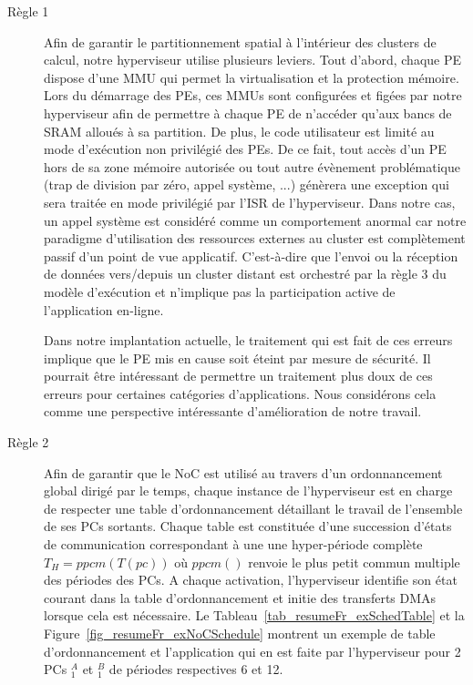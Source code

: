 \documentclass[main.tex]{subfiles}
\begin{document}
\begin{description}
    \item[Règle 1]
        Afin de garantir le partitionnement spatial à l'intérieur des clusters de calcul, notre hyperviseur utilise plusieurs leviers. Tout d'abord, chaque PE dispose d'une MMU qui permet la virtualisation et la protection mémoire. Lors du démarrage des PEs, ces MMUs sont configurées et figées par notre hyperviseur afin de permettre à chaque PE de n'accéder qu'aux bancs de SRAM alloués à sa partition. De plus, le code utilisateur est limité au mode d'exécution non privilégié des PEs. De ce fait, tout accès d'un PE hors de sa zone mémoire autorisée ou tout autre évènement problématique (trap de division par zéro, appel système, ...) génèrera une exception qui sera traitée en mode privilégié par l'ISR de l'hyperviseur. Dans notre cas, un appel système est considéré comme un comportement anormal car notre paradigme d'utilisation des ressources externes au cluster est complètement passif d'un point de vue applicatif. C'est-à-dire que l'envoi ou la réception de données vers/depuis un cluster distant est orchestré par la règle 3 du modèle d'exécution et n'implique pas la participation active de l'application en-ligne.
        
        Dans notre implantation actuelle, le traitement qui est fait de ces erreurs implique que le PE mis en cause soit éteint par mesure de sécurité. Il pourrait être intéressant de permettre un traitement plus doux de ces erreurs pour certaines catégories d'applications. Nous considérons cela comme une perspective intéressante d'amélioration de notre travail.
    \item[Règle 2]
        Afin de garantir que le NoC est utilisé au travers d'un ordonnancement global dirigé par le temps, chaque instance de l'hyperviseur est en charge de respecter une table d'ordonnancement détaillant le travail de l'ensemble de ses PCs sortants. Chaque table est constituée d'une succession d'états de communication correspondant à une une hyper-période complète $T_H = ppcm(T(pc))$ où $ppcm()$ renvoie le plus petit commun multiple des périodes des PCs. A chaque activation, l'hyperviseur identifie son état courant dans la table d'ordonnancement et initie des transferts DMAs lorsque cela est nécessaire. Le Tableau~\ref{tab_resumeFr_exSchedTable} et la Figure~\ref{fig_resumeFr_exNoCSchedule} montrent un exemple de table d'ordonnancement et l'application qui en est faite par l'hyperviseur pour 2 PCs \PC$_1^A$ et \PC$_1^B$ de périodes respectives 6 et 12.


\end{description}
\end{document}
